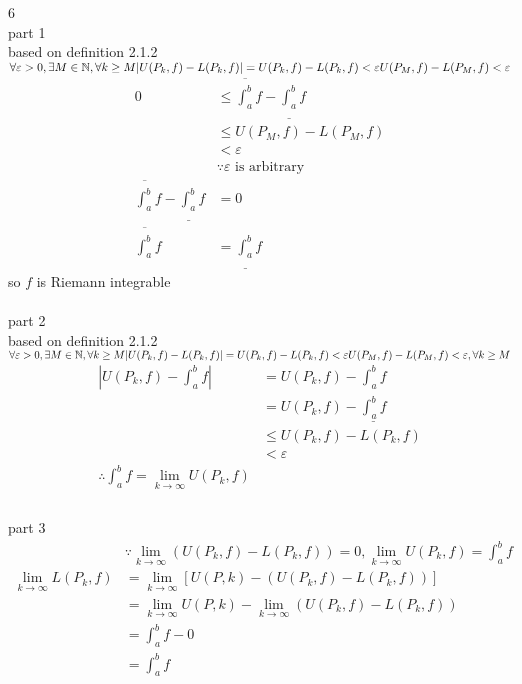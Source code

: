 \documentclass[12pt, border = 4pt, multi]{article} %
\begin{document}
\\
\\
6\\
part 1\\
based on definition 2.1.2\\
$\forall \varepsilon > 0, \exists M \in \mathbb{N}, \forall k \geq M\\
|U(P_k, f) - L(P_k, f)| = U(P_k, f) - L(P_k, f) < \varepsilon\\
U(P_M, f) - L(P_M, f) < \varepsilon$
\begin{align*}
0 &\leq \overline{\int_a ^ b} f - \underline{\int_a ^ b} f\\
&\leq U(P_M, f) - L(P_M, f)\\
&< \varepsilon\\
&\because \varepsilon \text{ is arbitrary }\\
\overline{\int_a ^ b} f - \underline{\int_a ^ b} f &= 0\\
\overline{\int_a ^ b} f &= \underline{\int_a ^ b} f
\end{align*}
so $f$ is Riemann integrable\\
\\
part 2\\
based on definition 2.1.2\\
$\forall \varepsilon > 0, \exists M \in \mathbb{N}, \forall k \geq M\\
|U(P_k, f) - L(P_k, f)| = U(P_k, f) - L(P_k, f) < \varepsilon\\
U(P_M, f) - L(P_M, f) < \varepsilon, \forall k \geq M$
\begin{align*}
\left|U(P_k, f) - \int_a ^ b f\right| &= U(P_k, f) - \int_a ^ b f\\
&= U(P_k, f) - \underline{\int_a ^ b f}\\
&\leq U(P_k, f) - L(P_k, f)\\
&< \varepsilon\\
\therefore \int_a ^ b f = \lim_{k \rightarrow \infty} U(P_k, f)\\
\end{align*}
\\
part 3\\
\begin{align*}
&\because \lim_{k \rightarrow \infty}\left(U(P_k, f) - L(P_k, f)\right) = 0, \lim_{k \rightarrow \infty} U(P_k, f) = \int_a ^ b f\\
\lim_{k \rightarrow \infty} L(P_k, f) &= \lim_{k \rightarrow \infty}[U(P, k) - (U(P_k, f) - L(P_k, f))]\\
&= \lim_{k \rightarrow \infty}U(P, k) - \lim_{k \rightarrow \infty}(U(P_k, f) - L(P_k, f))\\
&= \int_a ^ b f - 0\\
&= \int_a ^ b f\\
\end{align*}
\end{document}
